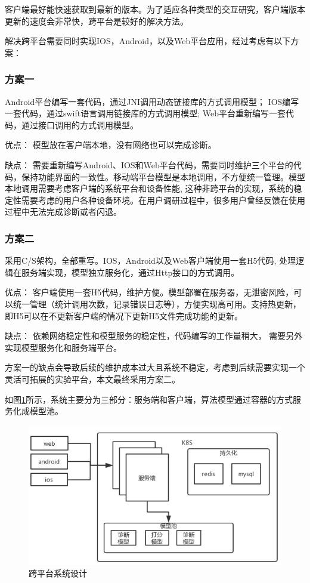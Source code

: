 
客户端最好能快速获取到最新的版本。为了适应各种类型的交互研究，客户端版本更新的速度会非常快，跨平台是较好的解决方法。

解决跨平台需要同时实现IOS，Android，以及Web平台应用，经过考虑有以下方案：

\subsubsection{方案一}
Android平台编写一套代码，通过JNI调用动态链接库的方式调用模型； IOS编写一套代码，通过swift语言调用链接库的方式调用模型; Web平台重新编写一套代码，通过接口调用的方式调用模型。

优点： 模型放在客户端本地，没有网络也可以完成诊断。

缺点： 需要重新编写Android、IOS和Web平台代码，需要同时维护三个平台的代码，保持功能界面的一致性。移动端平台模型是本地调用，不方便统一管理。模型本地调用需要考虑客户端的系统平台和设备性能,
这种非跨平台的实现，系统的稳定性需要考虑的用户各种设备环境。在用户调研过程中，很多用户曾经反馈在使用过程中无法完成诊断或者闪退。

\subsubsection{方案二}
采用C/S架构，全部重写。IOS，Android以及Web客户端使用一套H5代码, 处理逻辑在服务端实现，模型独立服务化，通过Http接口的方式调用。

优点： 客户端使用一套H5代码，维护方便。模型部署在服务器，无泄密风险，可以统一管理（统计调用次数，记录错误日志等），方便实现高可用。支持热更新，即H5可以在不更新客户端的情况下更新H5文件完成功能的更新。

缺点： 依赖网络稳定性和模型服务的稳定性，代码编写的工作量稍大， 需要另外实现模型服务化和服务端平台。

方案一的缺点会导致后续的维护成本过大且系统不稳定，考虑到后续需要实现一个灵活可拓展的实验平台，本文最终采用方案二。

如图\ref{fig:system}所示，系统主要分为三部分：服务端和客户端，算法模型通过容器的方式服务化成模型池。

\begin{figure}[ht]
    \centering
    \includegraphics[width=12cm]{images/system.png}
    \caption{跨平台系统设计}
    \label{fig:system}
\end{figure}

